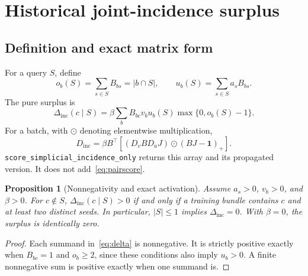 \documentclass[11pt,a4paper]{article}
\newtheorem{proposition}[theorem]{Proposition}
\theoremstyle{remark}
\newcommand{\inc}{\Delta_{\mathrm{inc}}}
\newcommand{\code}[1]{\texttt{\small #1}}
\begin{document}
\section{Historical joint-incidence surplus}
\subsection{Definition and exact matrix form}
For a query $S$, define
\begin{equation}
 o_b(S)=\sum_{s\in S}B_{bs}=|b\cap S|,\qquad
 u_b(S)=\sum_{s\in S}a_s B_{bs}.
\end{equation}
The pure surplus is
\begin{equation}
 \inc(c\mid S)=\beta\sum_b B_{bc}v_b u_b(S)
                      \max\{0,o_b(S)-1\}.
 \label{eq:delta}
\end{equation}
For a batch, with $\odot$ denoting elementwise multiplication,
\begin{equation}
 D_{\mathrm{inc}}=\beta B^\top
 \left[(D_v B D_aJ)\odot(BJ-\mathbf 1)_+\right].
 \label{eq:delta-matrix}
\end{equation}
\code{score\_simplicial\_incidence\_only} returns this array and its
propagated version. It does not add~\eqref{eq:pairscore}.

\begin{proposition}[Nonnegativity and exact activation]
Assume $a_s>0$, $v_b>0$, and $\beta>0$. For $c\notin S$,
$\inc(c\mid S)>0$ if and only if a training bundle contains $c$ and at
least two distinct seeds. In particular, $|S|\leq1$ implies $\inc=0$.
With $\beta=0$, the surplus is identically zero.
\end{proposition}
\begin{proof}
Each summand in~\eqref{eq:delta} is nonnegative. It is strictly positive
exactly when $B_{bc}=1$ and $o_b\geq2$, since these conditions also imply
$u_b>0$. A finite nonnegative sum is positive exactly when one summand is.
\end{proof}
\end{document}
